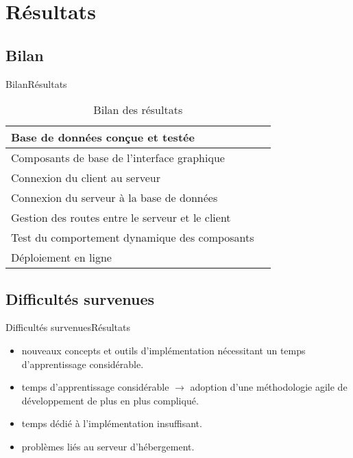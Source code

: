 \documentclass[usenames,dvipsnames]{beamer}
\newcommand{\cmark}{\ding{51}}
\newcommand{\xmark}{\ding{55}}
\begin{document}
\section{Résultats}
\subsection{Bilan}
\begin{frame}{Bilan}{Résultats}
\begin{table}[!ht]
  \centering
  \begin{tabular}{|l|c|}
  \hline
  Base de données conçue et testée & \cmark\\
  \hline
  Composants de base de l'interface graphique & \cmark\\
  \hline
  Connexion du client au serveur & \cmark\\
  \hline
  Connexion du serveur à la base de données & \cmark\\
  \hline
  Gestion des routes entre le serveur et le client & \xmark\\
  \hline
  Test du comportement dynamique des composants & \xmark\\
  \hline
  Déploiement en ligne & \xmark\\
  \hline
  \end{tabular}
  \caption{Bilan des résultats}
\end{table}
\end{frame}
\subsection{Difficultés survenues}
\begin{frame}{Difficultés survenues}{Résultats}
  \begin{itemize}
    \item nouveaux concepts et outils d'implémentation nécessitant un temps d'apprentissage considérable.
    \item temps d'apprentissage considérable $\rightarrow$ adoption d'une méthodologie agile de développement de plus en plus compliqué.
    \item temps dédié à l'implémentation insuffisant.
    \item problèmes liés au serveur d'hébergement.
  \end{itemize}
\end{frame}
\end{document}
